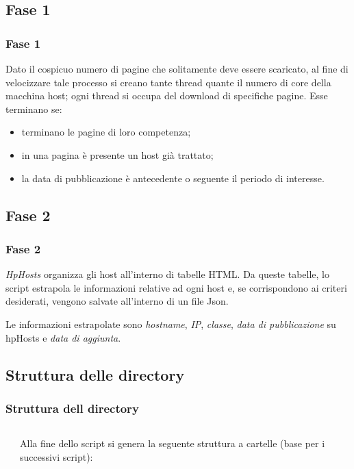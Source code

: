 \documentclass[aspectratio=169]{beamer}
\begin{document}
\subsection{Fase 1}
\begin{frame}
	\frametitle{Fase 1}
Dato il cospicuo numero di pagine che solitamente deve essere scaricato, al fine di velocizzare tale processo si creano 
tante thread quante il numero di core della macchina host; ogni thread si occupa del download di specifiche pagine. Esse terminano se:
\begin{itemize}
\item terminano le pagine di loro competenza;
\item in una pagina è presente un host già trattato;
\item la data di pubblicazione è antecedente o seguente il periodo di interesse.
\end{itemize}
\end{frame}

\subsection{Fase 2}
\begin{frame}
	\frametitle{Fase 2}
\textit{HpHosts} organizza gli host all'interno di tabelle HTML. Da queste tabelle, lo script estrapola le informazioni
relative ad ogni host e, se corrispondono ai criteri desiderati, vengono salvate all'interno di un file Json.

Le informazioni estrapolate sono \textit{hostname}, \textit{IP}, \textit{classe}, \textit{data di pubblicazione} su hpHosts e \textit{data di aggiunta}.
\end{frame}

\subsection{Struttura delle directory}
\begin{frame}
	\frametitle{Struttura dell directory}
	\begin{columns}\label{dir}
		\begin{column}{0.4\textwidth}
		Alla fine dello script si genera la seguente struttura a cartelle (base per i successivi script):
		\end{column}
		\begin{column}{0.4\textwidth}
		\end{column}
	\end{columns}
\end{frame}
\end{document}

